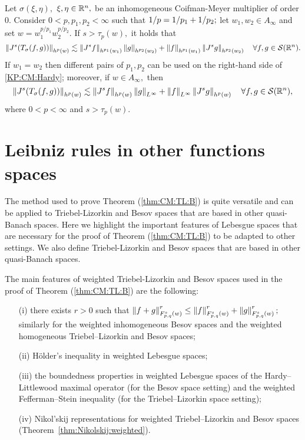 { 
 \begin{corollary}\label{coro:KP:CM:Hardyloc}  Let $\sigma(\xi,\eta),$ $\xi,\eta\in\rn,$ be an inhomogeneous Coifman-Meyer multiplier of order $0.$ 
Consider  $0 < p, p_1, p_2  < \infty$  such that $\hcline;$ let  $w_1,w_2\in A_\infty$ and set $w=w_1^{{p}/{p_1}} w_2^{{p}/{p_2}}.$ 
If  $s > \tau_p(w),$ it holds that
\begin{equation*}
\norm{J^s(T_\sigma(f,g))}{h^p(w)} \lesssim \norm{J^s f}{h^{p_1}(w_1)} \norm{g}{h^{p_2}(w_2)} +  \norm{f}{h^{p_1}(w_1)}   \norm{J^s g}{h^{p_2}(w_2)} \quad \forall f, g \in \sw.
\end{equation*}
If $w_1=w_2$ then different pairs of $p_1, p_2$ can be used on the right-hand side of \eqref{KP:CM:Hardy}; moreover, if $w\in A_\infty,$ then 
\begin{equation*}
\norm{J^s(T_\sigma(f,g))}{h^p(w)} \lesssim \norm{J^s f}{h^{p}(w)} \norm{g}{L^\infty} +  \norm{f}{L^\infty}   \norm{J^s g}{h^{p}(w)} \quad \forall f, g \in \sw,
\end{equation*}
where $0<p<\infty$ and $s>\tau_{p}(w).$
\end{corollary}
 
 \section{Leibniz rules in other functions spaces}
 The method used to prove Theorem (\ref{thm:CM:TL:B}) is quite versatile and can be applied to Triebel-Lizorkin and Besov spaces that are based in other quasi-Banach spaces. Here we highlight the important features of Lebesgue spaces that are necessary for the proof of Theorem (\ref{thm:CM:TL:B}) to be adapted to other settings. We also define Triebel-Lizorkin and Besov spaces that are based in other quasi-Banach spaces. 
 
The main features of weighted Triebel-Lizorkin and Besov spaces used in the proof of Theorem (\ref{thm:CM:TL:B}) are the following:
\begin{enumerate}
\item[(i)]\label{item:first} there exists $r>0$ such that $\norm{f+g}{\itlw{p}{s}{q}{w}}^r\le \norm{f}{\itlw{p}{s}{q}{w}}^r+\norm{g}{\itlw{p}{s}{q}{w}}^r;$ similarly for the weighted inhomogeneous  Besov spaces and the weighted homogeneous  Triebel--Lizorkin and Besov spaces;
\item[(ii)] \label{item:second} H\"older's inequality in weighted Lebesgue spaces;
\item[(iii)] \label{item:third}  the boundedness properties in weighted Lebesgue spaces  of the Hardy--Littlewood maximal operator (for the Besov space setting) and the weighted Fefferman--Stein inequality (for the Triebel--Lizorkin space setting);
\item[(iv)] \label{item:last} Nikol'skij representations for weighted Triebel--Lizorkin and Besov spaces (Theorem~\ref{thm:Nikolskij:weighted}).
\end{enumerate}

}

